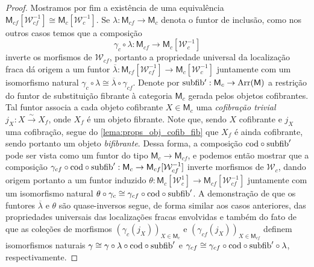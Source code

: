 \begin{proof}
  Mostramos por fim a existência de uma equivalência $\mathsf{M}_{cf}[\mathcal{W}_{cf}^{-1}] \cong \mathsf{M}_{c}[\mathcal{W}_{c}^{-1}]$.
  Se $\lambda: \mathsf{M}_{cf} \to \mathsf{M}_{c}$ denota o funtor de inclusão, como nos outros casos temos que a composição
  \begin{displaymath}
    \gamma_{c} \circ \lambda: \mathsf{M}_{cf} \to \mathsf{M}_{c}[\mathcal{W}_{c}^{-1}]
  \end{displaymath}
  inverte os morfismos de $\mathcal{W}_{cf}$, portanto a propriedade universal da localização fraca dá origem a um funtor $\overline{\lambda}: \mathsf{M}_{cf}[\mathcal{W}_{cf}^{-1}] \to \mathsf{M}_{c}[\mathcal{W}_{c}^{-1}]$ juntamente com um isomorfismo natural $\gamma_{c} \circ \lambda \cong \overline{\lambda} \circ \gamma_{cf}$.
  Denote por $\mathrm{subfib'}: \mathsf{M}_{c} \to \mathrm{Arr}(\mathsf{M})$ a restrição do funtor de substituição fibrante à categoria $\mathsf{M}_{c}$ gerada pelos objetos cofibrantes.
  Tal funtor associa a cada objeto cofibrante $X \in \mathsf{M}_{c}$ uma \emph{cofibração trivial} $j_{X}: X \overset{\sim}{\to} X_{f}$, onde $X_{f}$ é um objeto fibrante.
  Note que, sendo $X$ cofibrante e $j_{X}$ uma cofibração, segue do \cref{lema:props_obj_cofib_fib} que $X_{f}$ é ainda cofibrante, sendo portanto um objeto \emph{bifibrante}.
  Dessa forma, a composição $\mathrm{cod} \circ \mathrm{subfib}'$ pode ser vista como um funtor do tipo $\mathsf{M}_{c} \to \mathsf{M}_{cf}$, e podemos então mostrar que a composição $\gamma_{cf} \circ \mathrm{cod} \circ \mathrm{subfib}': \mathsf{M}_{c} \to \mathsf{M}_{cf}[\mathcal{W}_{cf}^{-1}]$ inverte morfismos de $\mathcal{W}_{c}$, dando origem portanto a um funtor induzido $\theta: \mathsf{M}_{c}[\mathcal{W}_{c}^{1}] \to \mathsf{M}_{cf}[\mathcal{W}_{cf}^{-1}]$ juntamente com um isomorfismo natural $\theta \circ \gamma_{c} \cong \gamma_{cf} \circ \mathrm{cod} \circ \mathrm{subfib}'$.
  A demonstração de que os funtores $\overline{\lambda}$ e $\theta$ são quase-inversos segue, de forma similar aos casos anteriores, das propriedades universais das localizações fracas envolvidas e também do fato de que as coleções de morfismos $(\gamma_{c}(j_{X}))_{X \in \mathsf{M}_{c}}$ e $(\gamma_{cf}(j_{X}))_{X \in \mathsf{M}_{cf}}$ definem isomorfismos naturais $\gamma \cong \gamma \circ \lambda \circ \mathrm{cod} \circ \mathrm{subfib}'$ e $\gamma_{cf} \cong \gamma_{cf} \circ \mathrm{cod} \circ \mathrm{subfib}' \circ \lambda$, respectivamente.
\end{proof}

